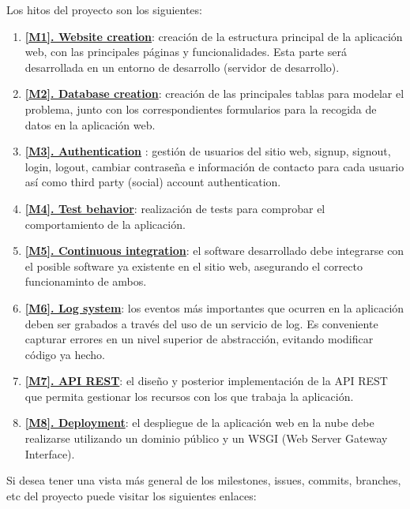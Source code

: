 Los hitos del proyecto son los siguientes:
\begin{enumerate}
    \item \textbf{\href{https://github.com/alexespana/TFG/milestone/1}{[M1]. Website
    creation}}: creación de la estructura principal de la aplicación web, con las
    principales páginas y funcionalidades. Esta parte será desarrollada en un entorno
    de desarrollo (servidor de desarrollo).
    \item \textbf{\href{https://github.com/alexespana/TFG/milestone/8}{[M2]. Database
    creation}}: creación de las principales tablas para modelar el problema, junto con
    los correspondientes formularios para la recogida de datos en la aplicación web.
    \item \textbf{\href{https://github.com/alexespana/TFG/milestone/2}{[M3]. Authentication}}
    : gestión de usuarios del sitio web, signup, signout, login, logout, cambiar
    contraseña e información de contacto para cada usuario así como third party (social)
    account authentication. 
    \item \textbf{\href{https://github.com/alexespana/TFG/milestone/3}{[M4]. Test behavior}}:
    realización de tests para comprobar el comportamiento de la aplicación.
    \item \textbf{\href{https://github.com/alexespana/TFG/milestone/4}{[M5]. Continuous
    integration}}: el software desarrollado debe integrarse con el posible software
    ya existente en el sitio web, asegurando el correcto funcionaminto de ambos.
    \item \textbf{\href{https://github.com/alexespana/TFG/milestone/5}{[M6]. Log system}}: 
    los eventos más importantes que ocurren en la aplicación deben ser grabados a través
    del uso de un servicio de log. Es conveniente capturar errores en un nivel superior
    de abstracción, evitando modificar código ya hecho.
    \item \textbf{\href{https://github.com/alexespana/TFG/milestone/6}{[M7]. API REST}}:
    el diseño y posterior implementación de la API REST que permita gestionar los recursos
    con los que trabaja la aplicación.
    \item \textbf{\href{https://github.com/alexespana/TFG/milestone/7}{[M8]. Deployment}}:
    el despliegue de la aplicación web en la nube debe realizarse utilizando un dominio
    público y un WSGI (Web Server Gateway Interface).
\end{enumerate}

Si desea tener una vista más general de los milestones, issues, commits, branches, etc del
proyecto puede visitar los siguientes enlaces:

